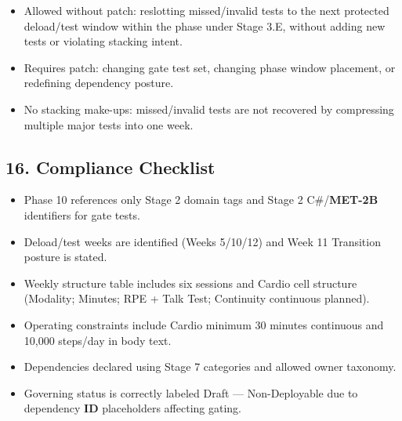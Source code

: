 \documentclass[10pt]{article}
\begin{document}
\begin{itemize}
\item Allowed without patch: reslotting missed/invalid tests to the next protected deload/test window within the phase under Stage 3.E, without adding new tests or violating stacking intent.
\item Requires patch: changing gate test set, changing phase window placement, or redefining dependency posture.
\item No stacking make-ups: missed/invalid tests are not recovered by compressing multiple major tests into one week.
\end{itemize}

\subsection*{16. Compliance Checklist}

\begin{itemize}
\item Phase 10 references only Stage 2 domain tags and Stage 2 C\#/\textbf{MET-2B} identifiers for gate tests.
\item Deload/test weeks are identified (Weeks 5/10/12) and Week 11 Transition posture is stated.
\item Weekly structure table includes six sessions and Cardio cell structure (Modality; Minutes; RPE + Talk Test; Continuity continuous planned).
\item Operating constraints include Cardio minimum 30 minutes continuous and 10,000 steps/day in body text.
\item Dependencies declared using Stage 7 categories and allowed owner taxonomy.
\item Governing status is correctly labeled Draft — Non-Deployable due to dependency \textbf{ID} placeholders affecting gating.
\end{itemize}
\end{document}
